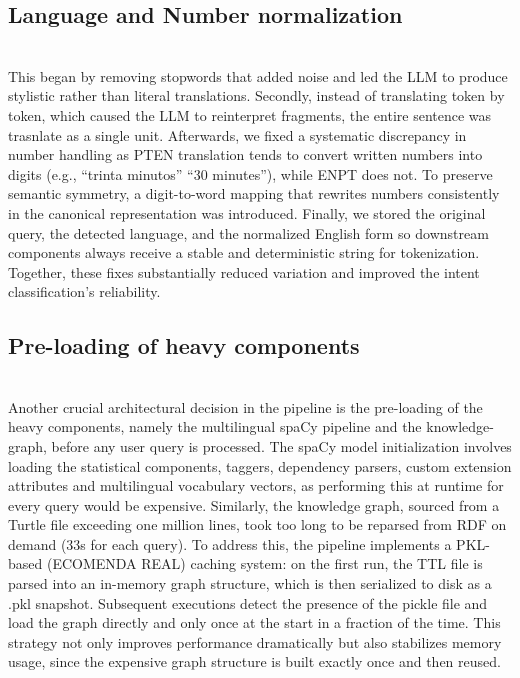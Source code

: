 \documentclass[conference]{IEEEtran}
\begin{document}
\subsection{Language and Number normalization}
\noindent
\\
This began by removing stopwords that added noise and led the LLM to produce stylistic rather than literal translations. Secondly, instead of translating token by token, which caused the LLM to reinterpret fragments, the entire sentence was trasnlate as a single unit. Afterwards, we fixed a systematic discrepancy in number handling as PT\textrightarrow{}EN translation tends to convert written numbers into digits (e.g., ``trinta minutos'' \textrightarrow{} ``30 minutes''), while EN\textrightarrow{}PT does not. To preserve semantic symmetry, a digit-to-word mapping that rewrites numbers consistently in the canonical representation was introduced. Finally, we stored the original query, the detected language, and the normalized English form so downstream components always receive a stable and deterministic string for tokenization. Together, these fixes substantially reduced variation and improved the intent classification's reliability.

\subsection{Pre-loading of heavy components}
\noindent
\\
Another crucial architectural decision in the pipeline is the pre-loading of the heavy components, namely the multilingual spaCy pipeline and the knowledge-graph, before any user query is processed. The spaCy model initialization involves loading the statistical components, taggers, dependency parsers, custom extension attributes and multilingual vocabulary vectors, as performing this at runtime for every query would be expensive. Similarly, the knowledge graph, sourced from a Turtle file exceeding one million lines, took too long to be reparsed from RDF on demand (33s for each query). To address this, the pipeline implements a PKL-based (ECOMENDA REAL) caching system: on the first run, the TTL file is parsed into an in-memory graph structure, which is then serialized to disk as a .pkl snapshot. Subsequent executions detect the presence of the pickle file and load the graph directly and only once at the start in a fraction of the time. This strategy not only improves performance dramatically but also stabilizes memory usage, since the expensive graph structure is built exactly once and then reused.
\end{document}
